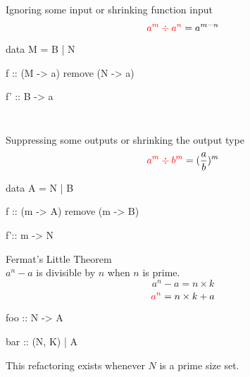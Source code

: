\documentclass{beamer}
\begin{document}
\begin{frame}[fragile]
\inputminted{Ruby}{inputSplit.rb}


\inputminted{text}{inputSplit.out}
\end{frame}


\begin{frame}[fragile]
Ignoring some input or shrinking function input 
$$\textcolor{red}{ a^{m} \div a^{n}} = a^{m-n}$$
\begin{code}
data M = B | N
\end{code}
\color{red}
\begin{code}
f :: (M -> a) remove (N -> a)
\end{code}
\color{black}
\begin{code}
f' :: B -> a
\end{code}
\end{frame}

\begin{frame}[fragile]
\inputminted{Ruby}{ignoreInput.rb}


\inputminted{text}{ignoreInput.out}
\end{frame}



\begin{frame}[fragile]
Suppressing some outputs or shrinking the output type
$$ \textcolor{red}{a^{m} \div b^{m} }= ({a \over b})^{m}$$
\begin{code}
data A = N | B
\end{code}
\color{red}
\begin{code}
f :: (m -> A) remove (m -> B)
\end{code}
\color{black}
\begin{code}
f':: m -> N
\end{code}
\end{frame}




\begin{frame}[fragile]
Fermat's Little Theorem\\
$ a^{n} - a$ is divisible by $n$ when $n$ is prime.
$$ a^{n} - a = n\times k$$
$$ \textcolor{red}{a^{n} }= n\times k + a$$
\color{red}
\begin{code}
foo :: N -> A
\end{code}
\color{black}
\begin{code}
bar :: (N, K) | A
\end{code}
This refactoring exists whenever $N$ is a prime size set.
\end{frame}
\end{document}
